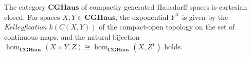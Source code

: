 The category $\mathbf{CGHaus}$ of compactly generated Hausdorff spaces is cartesian closed. For spaces $X, Y \in \mathbf{CGHaus}$, the exponential $Y^X$ is given by the \emph{Kelleyfication} $k(C(X, Y))$ of the compact-open topology on the set of continuous maps, and the natural bijection $\hom_{\mathbf{CGHaus}}(X \times Y, Z) \cong \hom_{\mathbf{CGHaus}}(X, Z^Y)$ holds.
